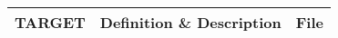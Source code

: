 \begin{longtable}{>{\ttfamily}l X >{\ttfamily}l}
	\toprule
	\textbf{TARGET} & \textbf{Definition \& Description} & \textbf{File} \\
	\midrule 
	
			
		
	\bottomrule
\end{longtable}